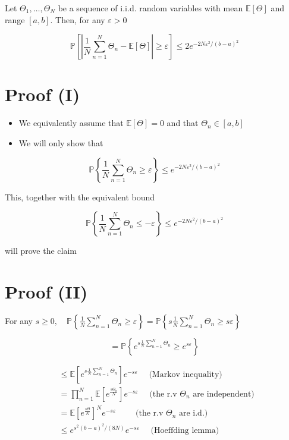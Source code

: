 Let $\Theta_{1}, \ldots, \Theta_{N}$ be a sequence of i.i.d. random variables with mean $\mathbb{E}[\Theta]$ and range $[a, b]$. Then, for any $\varepsilon>0$

$$
\mathbb{P}\left[\left|\frac{1}{N} \sum_{n=1}^{N} \Theta_{n}-\mathbb{E}[\Theta]\right| \geq \varepsilon\right] \leq 2 e^{-2 N \varepsilon^{2} /(b-a)^{2}}
$$

\section*{Proof (I)}
\begin{itemize}
  \item We equivalently assume that $\mathbb{E}[\Theta]=0$ and that $\Theta_{n} \in[a, b]$
  \item We will only show that
\end{itemize}

$$
\mathbb{P}\left\{\frac{1}{N} \sum_{n=1}^{N} \Theta_{n} \geq \varepsilon\right\} \leq e^{-2 N \varepsilon^{2} /(b-a)^{2}}
$$

This, together with the equivalent bound

$$
\mathbb{P}\left\{\frac{1}{N} \sum_{n=1}^{N} \Theta_{n} \leq-\varepsilon\right\} \leq e^{-2 N \varepsilon^{2} /(b-a)^{2}}
$$

will prove the claim

\section*{Proof (II)}
For any $s \geq 0, \quad \mathbb{P}\left\{\frac{1}{N} \sum_{n=1}^{N} \Theta_{n} \geq \varepsilon\right\}=\mathbb{P}\left\{s \frac{1}{N} \sum_{n=1}^{N} \Theta_{n} \geq s \varepsilon\right\}$

$$
=\mathbb{P}\left\{e^{s \frac{1}{N} \sum_{n=1}^{N} \Theta_{n}} \geq e^{s \varepsilon}\right\}
$$

$$
\begin{aligned}
& \leq \mathbb{E}\left[e^{s \frac{1}{N} \sum_{n=1}^{N} \Theta_{n}}\right] e^{-s \varepsilon} \quad \text { (Markov inequality) } \\
& =\prod_{n=1}^{N} \mathbb{E}\left[e^{\frac{s \Theta_{n}}{N}}\right] e^{-s \varepsilon} \quad \text { (the r.v } \Theta_{n} \text { are independent) } \\
& =\mathbb{E}\left[e^{\frac{s \Theta}{N}}\right]^{N} e^{-s \varepsilon} \quad \quad \text { (the r.v } \Theta_{n} \text { are i.d.) } \\
& \leq e^{s^{2}(b-a)^{2} /(8 N)} e^{-s \varepsilon} \quad \text { (Hoeffding lemma) }
\end{aligned}
$$

